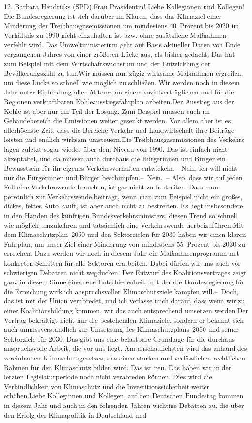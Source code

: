 \documentclass{article}
\begin{document}
	12. Barbara Hendricks (SPD) Frau Präsidentin! Liebe Kolleginnen und Kollegen! Die Bundesregierung ist sich darüber im Klaren, dass das Klimaziel einer Minderung der Treibhausgasemissionen um mindestens 40 Prozent bis 2020 im Verhältnis zu 1990 nicht einzuhalten ist bzw. ohne zusätzliche Maßnahmen verfehlt wird. Das Umweltministerium geht auf Basis aktueller Daten von Ende vergangenen Jahres von einer größeren Lücke aus, als bisher gedacht. Das hat zum Beispiel mit dem Wirtschaftswachstum und der Entwicklung der Bevölkerungszahl zu tun.Wir müssen nun zügig wirksame Maßnahmen ergreifen, um diese Lücke so schnell wie möglich zu schließen. Wir werden noch in diesem Jahr unter Einbindung aller Akteure an einem sozialverträglichen und für die Regionen verkraftbaren Kohleausstiegsfahrplan arbeiten.Der Ausstieg aus der Kohle ist aber nur ein Teil der Lösung. Zum Beispiel müssen auch im Gebäudebereich die Emissionen weiter gesenkt werden. Vor allem aber ist es allerhöchste Zeit, dass die Bereiche Verkehr und Landwirtschaft ihre Beiträge leisten und endlich wirksam umsteuern.Die Treibhausgasemissionen des Verkehrs lagen zuletzt sogar wieder über dem Niveau von 1990. Das ist einfach nicht akzeptabel, und da müssen auch durchaus die Bürgerinnen und Bürger ein Bewusstsein für ihr eigenes Verkehrsverhalten entwickeln.– Nein, ich will nicht nur die Bürgerinnen und Bürger beschimpfen.– Nein. – Also, dass wir auf jeden Fall eine Verkehrswende brauchen, ist gar nicht zu bestreiten. Dass man persönlich zur Verkehrswende beiträgt, wenn man zum Beispiel nicht ein großes, dickes, fettes Auto kauft, ist aber auch nicht zu bestreiten. Es liegt insbesondere in den Händen des künftigen Bundesverkehrsministers, diesen Trend so schnell wie möglich umzukehren und tatsächlich eine Verkehrswende herbeizuführen.Mit dem Klimaschutzplan 2050 und den Sektorzielen für 2030 haben wir einen klaren Fahrplan, um unser Ziel einer Minderung von mindestens 55 Prozent bis 2030 zu erreichen. Dazu werden wir noch in diesem Jahr ein Maßnahmenprogramm mit konkreten Schritten für alle Sektoren erarbeiten. Dabei dürfen wir uns auch vor schwierigen Debatten nicht wegducken. Der Entwurf des Koalitionsvertrages zeigt ganz in diesem Sinne eine neue Entschiedenheit, mit der die Bundesregierung für die Erreichung wirklich anspruchsvoller Klimaschutzziele kämpfen will.– Doch, das ist mit der Union verabredet, und ich verlasse mich darauf, dass wenn wir zu einer Koalitionsbildung kommen, wir das auch entsprechend umsetzen werden.Der Vertrag bekräftigt nicht nur die bestehenden Klimaziele, sondern er bekennt sich auch unmissverständlich zur Umsetzung des Klimaschutzplans 2050 und seiner Sektorziele für 2030. Das gibt uns eine belastbare Grundlage für die durchaus anspruchsvolle Arbeit, die vor uns liegt. Am anschaulichsten wird das anhand des vereinbarten Klimaschutzgesetzes, das einen starken und verlässlichen rechtlichen Rahmen für den Klimaschutz bilden wird. Das ist neu. Das haben wir in der letzten Legislaturperiode noch nicht verabreden können. Dies wird die Verbindlichkeit von Klimaschutz und die Investitionssicherheit weiter erhöhen.Liebe Kolleginnen und Kollegen, auf den Deutschen Bundestag kommen in diesem Jahr und auch in den folgenden Jahren wichtige Debatten zu, die über den Erfolg der Klimapolitik in Deutschland und 
\end{document}
